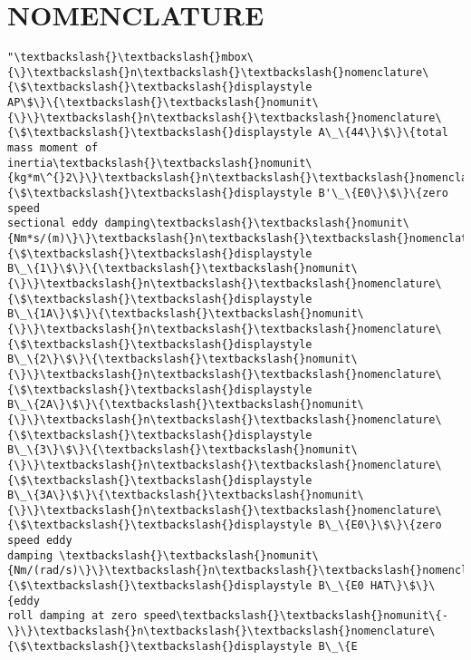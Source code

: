 \section*{NOMENCLATURE}\label{nomenclature}

            \begin{tcolorbox}[breakable, size=fbox, boxrule=.5pt, pad at break*=1mm, opacityfill=0]
\begin{Verbatim}[commandchars=\\\{\}]
"\textbackslash{}\textbackslash{}mbox\{\}\textbackslash{}n\textbackslash{}\textbackslash{}nomenclature\{\$\textbackslash{}\textbackslash{}displaystyle
AP\$\}\{\textbackslash{}\textbackslash{}nomunit\{\}\}\textbackslash{}n\textbackslash{}\textbackslash{}nomenclature\{\$\textbackslash{}\textbackslash{}displaystyle A\_\{44\}\$\}\{total mass moment of
inertia\textbackslash{}\textbackslash{}nomunit\{kg*m\^{}2\}\}\textbackslash{}n\textbackslash{}\textbackslash{}nomenclature\{\$\textbackslash{}\textbackslash{}displaystyle B'\_\{E0\}\$\}\{zero speed
sectional eddy damping\textbackslash{}\textbackslash{}nomunit\{Nm*s/(m)\}\}\textbackslash{}n\textbackslash{}\textbackslash{}nomenclature\{\$\textbackslash{}\textbackslash{}displaystyle
B\_\{1\}\$\}\{\textbackslash{}\textbackslash{}nomunit\{\}\}\textbackslash{}n\textbackslash{}\textbackslash{}nomenclature\{\$\textbackslash{}\textbackslash{}displaystyle
B\_\{1A\}\$\}\{\textbackslash{}\textbackslash{}nomunit\{\}\}\textbackslash{}n\textbackslash{}\textbackslash{}nomenclature\{\$\textbackslash{}\textbackslash{}displaystyle
B\_\{2\}\$\}\{\textbackslash{}\textbackslash{}nomunit\{\}\}\textbackslash{}n\textbackslash{}\textbackslash{}nomenclature\{\$\textbackslash{}\textbackslash{}displaystyle
B\_\{2A\}\$\}\{\textbackslash{}\textbackslash{}nomunit\{\}\}\textbackslash{}n\textbackslash{}\textbackslash{}nomenclature\{\$\textbackslash{}\textbackslash{}displaystyle
B\_\{3\}\$\}\{\textbackslash{}\textbackslash{}nomunit\{\}\}\textbackslash{}n\textbackslash{}\textbackslash{}nomenclature\{\$\textbackslash{}\textbackslash{}displaystyle
B\_\{3A\}\$\}\{\textbackslash{}\textbackslash{}nomunit\{\}\}\textbackslash{}n\textbackslash{}\textbackslash{}nomenclature\{\$\textbackslash{}\textbackslash{}displaystyle B\_\{E0\}\$\}\{zero speed eddy
damping \textbackslash{}\textbackslash{}nomunit\{Nm/(rad/s)\}\}\textbackslash{}n\textbackslash{}\textbackslash{}nomenclature\{\$\textbackslash{}\textbackslash{}displaystyle B\_\{E0 HAT\}\$\}\{eddy
roll damping at zero speed\textbackslash{}\textbackslash{}nomunit\{-\}\}\textbackslash{}n\textbackslash{}\textbackslash{}nomenclature\{\$\textbackslash{}\textbackslash{}displaystyle B\_\{E

\end{Verbatim}
\end{tcolorbox}
